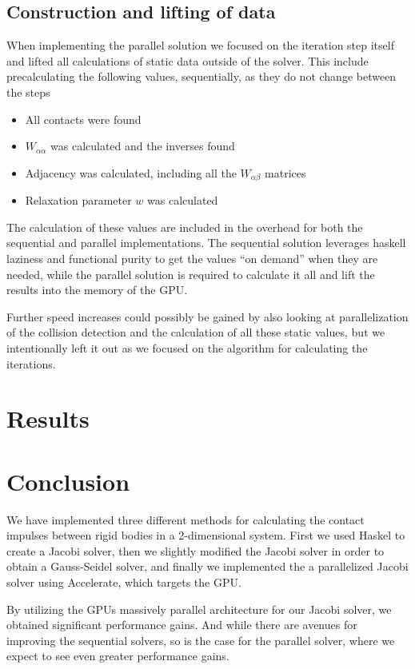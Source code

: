\documentclass[runningheads,a4paper]{llncs}
\begin{document}
\subsection{Construction and lifting of data}
When implementing the parallel solution
we focused on the iteration step itself
and lifted all calculations of static data
outside of the solver.
This include precalculating the following values,
sequentially, as they do not change between the steps

\begin{itemize}
\item All contacts were found
\item $W_{\alpha\alpha}$ was calculated and the inverses found
\item Adjacency was calculated, including all the $W_{\alpha\beta}$ matrices
\item Relaxation parameter $w$ was calculated
\end{itemize}

The calculation of these values are included in the overhead for both
the sequential and parallel implementations.
The sequential solution leverages haskell laziness and functional purity
to get the values ``on demand'' when they are needed,
while the parallel solution is required to calculate it all
and lift the results into the memory of the GPU.

Further speed increases could possibly be gained
by also looking at parallelization of the collision detection
and the calculation of all these static values,
but we intentionally left it out as we focused on the algorithm
for calculating the iterations.

\section{Results}

\section{Conclusion}

We have implemented three different methods for calculating the contact
impulses between rigid bodies in a 2-dimensional system. First we used Haskel
to create a Jacobi solver, then we slightly modified the Jacobi solver in order
to obtain a Gauss-Seidel solver, and finally we implemented the a parallelized
Jacobi solver using Accelerate, which targets the GPU.

By utilizing the GPUs massively parallel architecture for our Jacobi solver, we
obtained significant performance gains. And while there are avenues
for improving the sequential solvers, so is the case for the parallel solver,
where we expect to see even greater performance gains.
\end{document}
